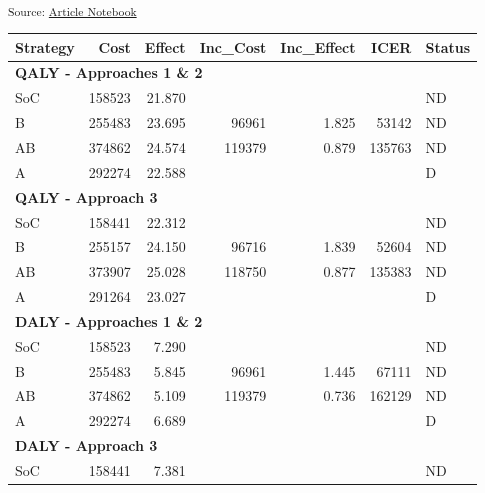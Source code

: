 \documentclass[
]{agujournal2019}
\begin{document}
\textsubscript{Source:
\href{https://graveja0.github.io/dalys/index.qmd.html}{Article
Notebook}}

\begin{table}
\centering
\begin{tabular}{l|r|r|r|r|r|l}
\hline
Strategy & Cost & Effect & Inc\_Cost & Inc\_Effect & ICER & Status\\
\hline
\multicolumn{7}{l}{\textbf{QALY - Approaches 1 \& 2}}\\
\hline
\hspace{1em}SoC & 158523 & 21.870 &  &  &  & \vphantom{1} ND\\
\hline
\hspace{1em}B & 255483 & 23.695 & 96961 & 1.825 & 53142 & \vphantom{1} ND\\
\hline
\hspace{1em}AB & 374862 & 24.574 & 119379 & 0.879 & 135763 & ND\\
\hline
\hspace{1em}A & 292274 & 22.588 &  &  &  & D\\
\hline
\multicolumn{7}{l}{\textbf{QALY - Approach 3}}\\
\hline
\hspace{1em}SoC & 158441 & 22.312 &  &  &  & ND\\
\hline
\hspace{1em}B & 255157 & 24.150 & 96716 & 1.839 & 52604 & ND\\
\hline
\hspace{1em}AB & 373907 & 25.028 & 118750 & 0.877 & 135383 & ND\\
\hline
\hspace{1em}A & 291264 & 23.027 &  &  &  & D\\
\hline
\multicolumn{7}{l}{\textbf{DALY - Approaches 1 \& 2}}\\
\hline
\hspace{1em}SoC & 158523 & 7.290 &  &  &  & ND\\
\hline
\hspace{1em}B & 255483 & 5.845 & 96961 & 1.445 & 67111 & ND\\
\hline
\hspace{1em}AB & 374862 & 5.109 & 119379 & 0.736 & 162129 & ND\\
\hline
\hspace{1em}A & 292274 & 6.689 &  &  &  & D\\
\hline
\multicolumn{7}{l}{\textbf{DALY - Approach 3}}\\
\hline
\hspace{1em}SoC & 158441 & 7.381 &  &  &  & ND\\

\end{tabular}
\end{table}
\end{document}
